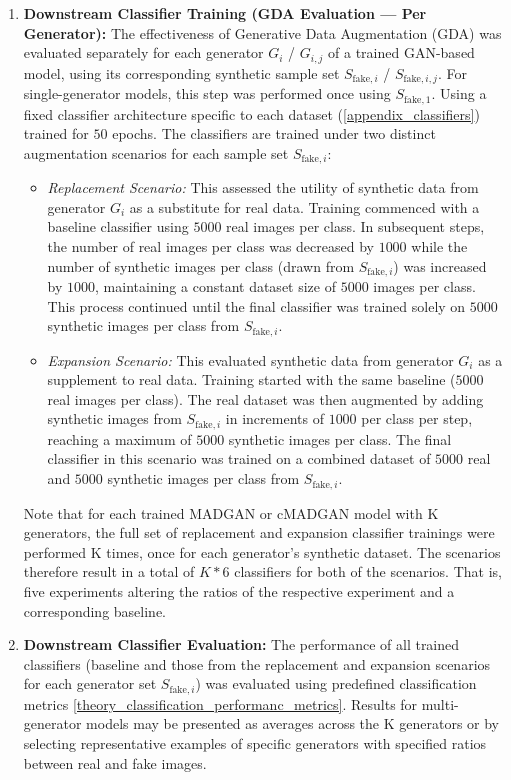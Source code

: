 \begin{enumerate}
    \item \textbf{Downstream Classifier Training (GDA Evaluation --- Per Generator):} The effectiveness of Generative Data Augmentation (GDA) was evaluated separately for each generator \(G_i\) / \(G_{i, j}\) of a trained GAN-based model, using its corresponding synthetic sample set \(S_{\text{fake}, i}\) / \(S_{\text{fake}, i, j}\). For single-generator models, this step was performed once using \(S_{\text{fake}, 1}\). Using a fixed classifier architecture specific to each dataset (\ref{appendix_classifiers}) trained for $50$ epochs. The classifiers are trained under two distinct augmentation scenarios for each sample set \(S_{\text{fake}, i}\):
        \begin{itemize} \label{exp_setup_difference_replace_expand}
            \item \textit{Replacement Scenario:} This assessed the utility of synthetic data from generator \(G_i\) as a substitute for real data. Training commenced with a baseline classifier using $5 000$ real images per class. In subsequent steps, the number of real images per class was decreased by $1 000$ while the number of synthetic images per class (drawn from \(S_{\text{fake}, i}\)) was increased by $1 000$, maintaining a constant dataset size of $5 000$ images per class. This process continued until the final classifier was trained solely on $5 000$ synthetic images per class from \(S_{\text{fake}, i}\).
            \item \textit{Expansion Scenario:} This evaluated synthetic data from generator \(G_i\) as a supplement to real data. Training started with the same baseline ($5 000$ real images per class). The real dataset was then augmented by adding synthetic images from \(S_{\text{fake}, i}\) in increments of $1 000$ per class per step, reaching a maximum of $5 000$ synthetic images per class. The final classifier in this scenario was trained on a combined dataset of $5 000$ real and $5 000$ synthetic images per class from \(S_{\text{fake}, i}\).
        \end{itemize}
      Note that for each trained MADGAN or cMADGAN model with K generators, the full set of replacement and expansion classifier trainings were performed K times, once for each generator's synthetic dataset. The scenarios therefore result in a total of $K * 6$ classifiers for both of the scenarios. That is, five experiments altering the ratios of the respective experiment and a corresponding baseline.

    \item \textbf{Downstream Classifier Evaluation:} The performance of all trained classifiers (baseline and those from the replacement and expansion scenarios for each generator set \(S_{\text{fake}, i}\)) was evaluated using predefined classification metrics \ref{theory_classification_performanc_metrics}. Results for multi-generator models may be presented as averages across the K generators or by selecting representative examples of specific generators with specified ratios between real and fake images.
\end{enumerate}

